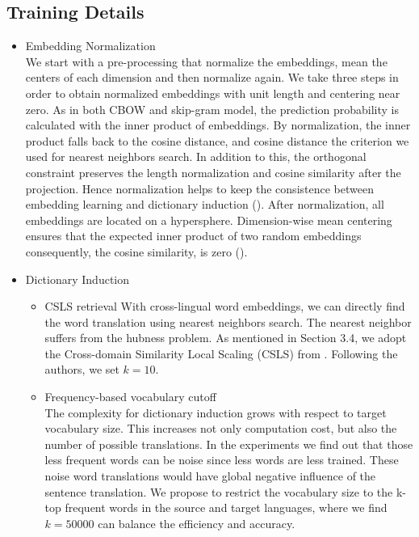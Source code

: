 \subsection{Training Details}
\begin{itemize}
	
\item Embedding Normalization\\
We start with a pre-processing that normalize the embeddings, mean the centers of each dimension and then normalize again. We take three steps in order to obtain normalized embeddings with unit length and centering near zero. As in both CBOW and skip-gram model, the prediction probability is calculated with the inner product of embeddings. By normalization, the inner product falls back to the cosine distance, and cosine distance the criterion we used for nearest neighbors search. In addition to this, the orthogonal constraint preserves the length normalization and cosine similarity after the projection. Hence normalization helps to keep the consistence between embedding learning and dictionary induction (\cite{xing2015normalized}). After normalization, all embeddings are located on a hypersphere. Dimension-wise mean centering ensures that the expected inner product of two random embeddings  consequently, the cosine similarity, is zero (\cite{artetxe2016learning}).

	\item Dictionary Induction
	\begin{itemize}
		\item CSLS retrieval
		 With cross-lingual word embeddings, we can directly find the word translation using nearest neighbors search. The nearest neighbor suffers from the hubness problem. As mentioned in Section 3.4, we adopt the Cross-domain Similarity Local Scaling (CSLS) from \cite{conneau2017word}. Following the authors, we set $k=10$.
		 \item Frequency-based vocabulary cutoff\\
		 The complexity for dictionary induction grows with respect to target vocabulary size. This increases not only  computation cost, but also the number of possible translations. In the experiments we find out that those less frequent words can be noise since less words are less trained. These noise word translations would have global negative influence of the sentence translation.
		 We propose to restrict the vocabulary size to the k-top frequent words in the source and target languages, where we find $k=50000$ can balance the efficiency and accuracy.	 
	\end{itemize}



\end{itemize}

